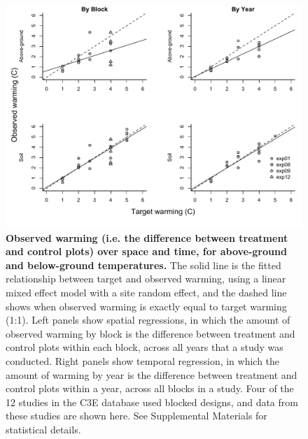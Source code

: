 \documentclass{article}
\begin{document}
 \begin{figure}[p]
   \centering
 \includegraphics{../Analyses/figures/blockyearvar.pdf}  
 \caption{\textbf{Observed warming (i.e. the difference between treatment and control plots) over space and time, for above-ground and below-ground temperatures.} The solid line is the fitted relationship between target and observed warming, using a linear mixed effect model with a site random effect, and the dashed line shows when observed warming is exactly equal to target warming (1:1). Left panels show spatial regressions, in which the amount of observed warming by block is the difference between treatment and control plots within each block, across all years that a study was conducted. Right panels show temporal regression, in which the amount of warming by year is the difference between treatment and control plots within a year, across all blocks in a study. Four of the 12 studies in the C3E database used blocked designs, and data from these studies are shown here. See Supplemental Materials for statistical details.}
 \label{fig:blockyear}
 \end{figure}
 \clearpage
 
\end{document}
